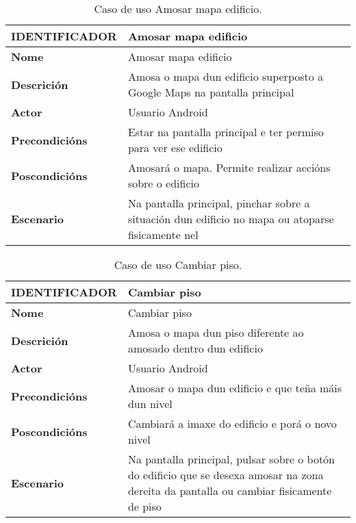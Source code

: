\begin{table} [tbh]
	\footnotesize
	\centering
	\begin{tabular}{|l|p{10cm}|}
		\hline 
		\textbf{IDENTIFICADOR}	& \textbf{Amosar mapa edificio} \\ 
		\hline 
		\textbf{Nome} & Amosar mapa edificio \\ 
		\hline 
		\textbf{Descrición} & Amosa o mapa dun edificio superposto a Google Maps na pantalla principal \\ 
		\hline 
		\textbf{Actor} & Usuario Android \\ 
		\hline 
		\textbf{Precondicións} & Estar na pantalla principal e ter permiso para ver ese edificio \\ 
		\hline 
		\textbf{Poscondicións} & Amosará o mapa. Permite realizar accións sobre o edificio \\ 
		\hline 
		\textbf{Escenario} & Na pantalla principal, pinchar sobre a situación dun edificio no mapa ou atoparse fisicamente nel \\ 
		\hline 
	\end{tabular}
	\caption{Caso de uso Amosar mapa edificio.}
	\label{tab:cuAmosarMapaEdificio}
\end{table}

\begin{table} [tbh]
	\footnotesize
	\centering
	\begin{tabular}{|l|p{10cm}|}
		\hline 
		\textbf{IDENTIFICADOR}	& \textbf{Cambiar piso} \\ 
		\hline 
		\textbf{Nome} & Cambiar piso \\ 
		\hline 
		\textbf{Descrición} & Amosa o mapa dun piso diferente ao amosado dentro dun edificio \\ 
		\hline 
		\textbf{Actor} & Usuario Android \\ 
		\hline 
		\textbf{Precondicións} & Amosar o mapa dun edificio e que teña máis dun nivel \\ 
		\hline 
		\textbf{Poscondicións} & Cambiará a imaxe do edificio e porá o novo nivel \\ 
		\hline 
		\textbf{Escenario} & Na pantalla principal, pulsar sobre o botón do edificio que se desexa amosar na zona dereita da pantalla ou cambiar fisicamente de piso \\ 
		\hline 
	\end{tabular}
	\caption{Caso de uso Cambiar piso.}
	\label{tab:cuCambiarPiso}
\end{table}

